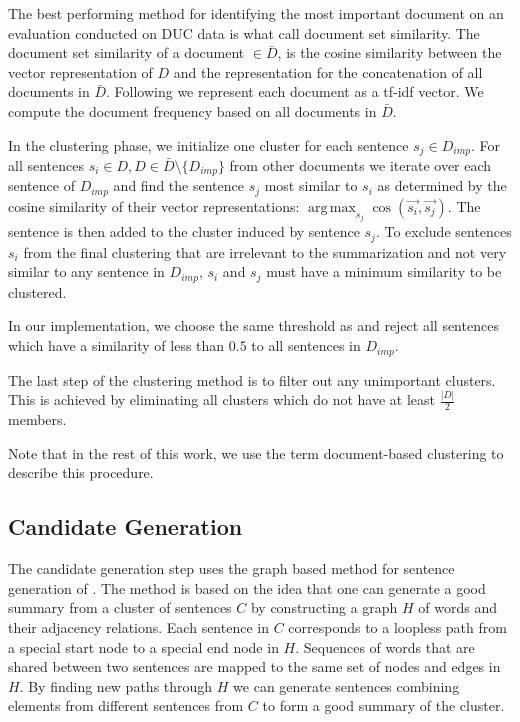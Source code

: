 \documentclass[a4paper,BCOR=10mm]{report}
\DeclareMathOperator*{\argmax}{arg\,max}
\numberwithin{lemma}{chapter}
\numberwithin{definition}{chapter}
\begin{document}
The best performing method for identifying the most important document on an evaluation conducted on DUC data is what \citeauthor{banerjee} call document set similarity.
The document set similarity of a document $ \in \bar{D}$, is the cosine similarity between the vector representation of $D$ and the representation for the concatenation of all documents in $\bar{D}$.
Following \citeauthor{banerjee} we represent each document as a tf-idf vector. We compute the document frequency based on all documents in $\bar{D}$.

In the clustering phase, we initialize one cluster for each sentence $s_j \in D_{imp}$. For all sentences $s_i \in D, D \in \bar{D} \setminus \{D_{imp}\}$ from other documents we iterate over each sentence of $D_{imp}$ and find the sentence $s_j$ most similar to $s_i$ as determined by the cosine similarity of their vector representations: $\argmax_{s_j} \cos(\vec{s_i}, \vec{s_j})$. The sentence is then added to the cluster induced by sentence $s_j$. To exclude sentences $s_i$ from the final clustering that are irrelevant to the summarization and not very similar to any sentence in $D_{imp}$, $s_i$ and $s_j$ must have a minimum similarity to be clustered.

In our implementation, we choose the same threshold as \citeauthor{banerjee} and reject all sentences which have a similarity of less than $0.5$ to all sentences in $D_{imp}$.

The last step of the clustering method is to filter out any unimportant clusters. This is achieved by eliminating all clusters which do not have at least $\frac{|D|}{2}$ members.

Note that in the rest of this work, we use the term document-based clustering to describe this procedure.


\subsection{Candidate Generation} \label{sec:baseline-generation}

The candidate generation step uses the graph based method for sentence generation of \citet{filippova}. The method is based on the idea that one can generate a good summary from a cluster of sentences $C$ by constructing a graph $H$ of words and their adjacency relations. Each sentence in $C$ corresponds to a loopless path from a special start node to a special end node in $H$. Sequences of words that are shared between two sentences are mapped to the same set of nodes and edges in $H$. By finding new paths through $H$ we can generate sentences combining elements from different sentences from $C$ to form a good summary of the cluster.
\end{document}

